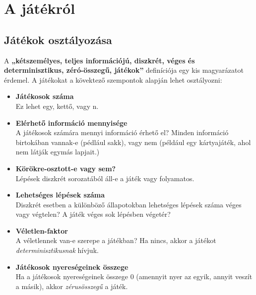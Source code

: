 \documentclass[twoside, a4paper, 12pt]{article}
\begin{document}
\section{A játékról}
\subsection{Játékok osztályozása}
A \textbf{„kétszemélyes, teljes információjú, diszkrét, véges és determinisztikus, zéró-összegű, játékok”} definíciója egy kis magyarázatot érdemel. A játékokat a kövektező szempontok alapján lehet osztályozni:

\begin{itemize}
	\item \textbf{Játékosok száma} \\
	Ez lehet egy, kettő, vagy n.
	
	\item \textbf{Elérhető információ mennyisége} \\
	A játékosok számára mennyi információ érhető el? Minden információ birtokában vannak-e (pédlául sakk), vagy nem (például egy kártyajáték, ahol nem látják egymás lapjait.)
	
	\item \textbf{Körökre-osztott-e vagy sem?} \\
	Lépések diszkrét sorozatából áll-e a játék vagy folyamatos.
	
	\item \textbf{Lehetséges lépések száma} \\
	Diszkrét esetben a különböző állapotokban lehetséges lépések száma véges vagy végtelen? A játék véges sok lépésben végetér?
	
	\item \textbf{Véletlen-faktor} \\
	A véletlennek van-e szerepe a játékban? Ha nincs, akkor a játékot \textit{determinisztikusnak} hívjuk.
	
	\item \textbf{Játékosok nyereségeinek összege} \\
	Ha a játékosok nyereségeinek összege 0 (amennyit nyer az egyik, annyit veszít a másik), akkor \textit{zérusösszegű} a játék.
\end{itemize}
\end{document}
